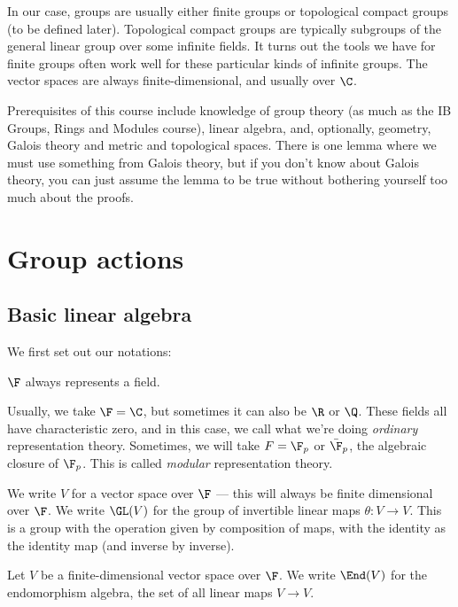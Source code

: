 \documentclass[a4paper]{article}
\begin{document}
In our case, groups are usually either finite groups or topological compact groups (to be defined later). Topological compact groups are typically subgroups of the general linear group over some infinite fields. It turns out the tools we have for finite groups often work well for these particular kinds of infinite groups. The vector spaces are always finite-dimensional, and usually over $\C$.

Prerequisites of this course include knowledge of group theory (as much as the IB Groups, Rings and Modules course), linear algebra, and, optionally, geometry, Galois theory and metric and topological spaces. There is one lemma where we must use something from Galois theory, but if you don't know about Galois theory, you can just assume the lemma to be true without bothering  yourself too much about the proofs.


\section{Group actions}

\subsection{Basic linear algebra}
We first set out our notations:

\begin{notation}
  $\F$ always represents a field.
\end{notation}

Usually, we take $\F = \C$, but sometimes it can also be $\R$ or $\Q$. These fields all have characteristic zero, and in this case, we call what we're doing \emph{ordinary} representation theory. Sometimes, we will take $F = \F_p$ or $\bar{\F}_p$, the algebraic closure of $\F_p$. This is called \emph{modular} representation theory.

\begin{notation}
  We write $V$ for a vector space over $\F$ --- this will always be finite dimensional over $\F$. We write $\GL(V)$ for the group of invertible linear maps $\theta: V \to V$. This is a group with the operation given by composition of maps, with the identity as the identity map (and inverse by inverse).
\end{notation}

\begin{notation}
  Let $V$ be a finite-dimensional vector space over $\F$. We write $\End(V)$ for the endomorphism algebra, the set of all linear maps $V \to V$.
\end{notation}
\end{document}
